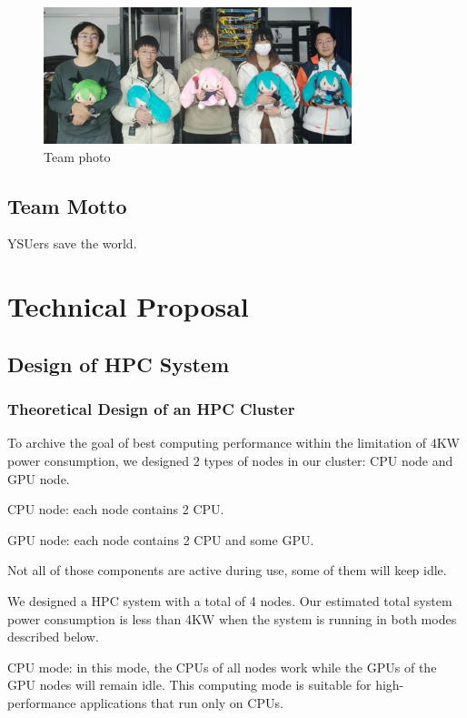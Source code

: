 \documentclass[a4paper,12pt]{article}
\begin{document}
\begin{figure}[H]
    \centering
    \includegraphics[width=0.8\textwidth]{images/team/Team_Photo.png}
    \caption{Team photo}
    \label{fig:team_photo}
\end{figure}


\subsection{Team Motto}

YSUers save the world.

\newpage

\section{Technical Proposal}

\subsection{Design of HPC System}

\subsubsection{Theoretical Design of an HPC Cluster}

To archive the goal of best computing performance within the limitation of 4KW power consumption, we designed 2 types of nodes in our cluster: CPU node and GPU node.

CPU node: each node contains 2 CPU.

GPU node: each node contains 2 CPU and some GPU.

Not all of those components are active during use, some of them will keep idle.

We designed a HPC system with a total of 4 nodes. Our estimated total system power consumption is less than 4KW when the system is running in both modes described below.

CPU mode: in this mode, the CPUs of all nodes work while the GPUs of the GPU nodes will remain idle. This computing mode is suitable for high-performance applications that run only on CPUs.
\end{document}
